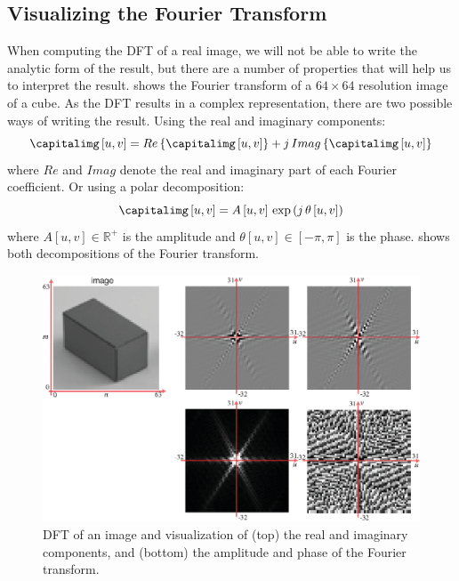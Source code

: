 \subsection{Visualizing the Fourier Transform}


When computing the DFT of a real image, we will not be able to write the analytic form of the result, but there are a number of properties that will help us to interpret the result. \Fig{\ref{fig:DFT_a}} shows the Fourier transform of a $64 \times 64$ resolution image of a cube.
As the DFT results in a complex representation, there are two possible ways of writing the result. Using the real and imaginary components:
\begin{equation}
\capitalimg \left[u,v \right] = Re \left\{\capitalimg \left[u,v \right] \right\}  + j \, Imag \left\{\capitalimg \left[u,v \right] \right\}
\end{equation}
where $Re$ and $Imag$ denote the real and imaginary part of each Fourier coefficient. Or using a polar decomposition:
\begin{equation}
\capitalimg \left[u,v \right]  = A \left[u,v \right] \, \exp{\left( j \, \theta\left[u,v \right]  \right)}
\end{equation}
where $A \left[u,v \right] \in \mathbb{R}^+$ is the amplitude and $\theta \left[u,v \right] \in \left[-\pi, \pi \right]$ is the phase. 
\Fig{\ref{fig:DFT_a}} shows both decompositions of the Fourier transform.


\begin{figure}[t]
\centerline{
\includegraphics[width=1\linewidth]{figures/Image_processing_fourier/dft_a.eps}
}
\caption{DFT of an image and visualization of (top) the real and imaginary components,
and (bottom) the amplitude and phase  of the Fourier transform.} 
\label{fig:DFT_a}
\end{figure}

